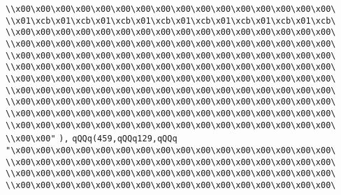 \verb|\\x00\x00\x00\x00\x00\x00\x00\x00\x00\x00\x00\x00\x00\x00\x00\x00\|\newline
\verb|\\x01\xcb\x01\xcb\x01\xcb\x01\xcb\x01\xcb\x01\xcb\x01\xcb\x01\xcb\|\newline
\verb|\\x00\x00\x00\x00\x00\x00\x00\x00\x00\x00\x00\x00\x00\x00\x00\x00\|\newline
\verb|\\x00\x00\x00\x00\x00\x00\x00\x00\x00\x00\x00\x00\x00\x00\x00\x00\|\newline
\verb|\\x00\x00\x00\x00\x00\x00\x00\x00\x00\x00\x00\x00\x00\x00\x00\x00\|\newline
\verb|\\x00\x00\x00\x00\x00\x00\x00\x00\x00\x00\x00\x00\x00\x00\x00\x00\|\newline
\verb|\\x00\x00\x00\x00\x00\x00\x00\x00\x00\x00\x00\x00\x00\x00\x00\x00\|\newline
\verb|\\x00\x00\x00\x00\x00\x00\x00\x00\x00\x00\x00\x00\x00\x00\x00\x00\|\newline
\verb|\\x00\x00\x00\x00\x00\x00\x00\x00\x00\x00\x00\x00\x00\x00\x00\x00\|\newline
\verb|\\x00\x00\x00\x00\x00\x00\x00\x00\x00\x00\x00\x00\x00\x00\x00\x00\|\newline
\verb|\\x00\x00\x00\x00\x00\x00\x00\x00\x00\x00\x00\x00\x00\x00\x00\x00\|\newline
\verb|\\x00\x00"|\newline
\verb|),|\newline
\verb|qQQq(459,qQQq129,qQQq|\newline
\verb|"\x00\x00\x00\x00\x00\x00\x00\x00\x00\x00\x00\x00\x00\x00\x00\x00\|\newline
\verb|\\x00\x00\x00\x00\x00\x00\x00\x00\x00\x00\x00\x00\x00\x00\x00\x00\|\newline
\verb|\\x00\x00\x00\x00\x00\x00\x00\x00\x00\x00\x00\x00\x00\x00\x00\x00\|\newline
\verb|\\x00\x00\x00\x00\x00\x00\x00\x00\x00\x00\x00\x00\x00\x00\x00\x00\|\newline
